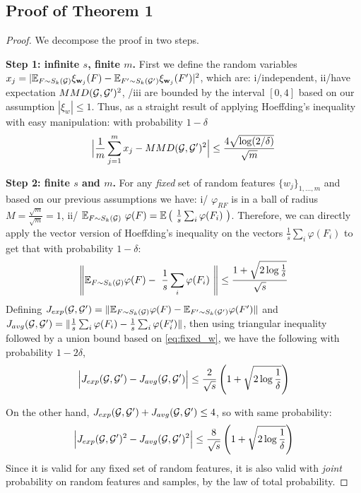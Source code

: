 \begin{appendices}
\section{Proof of Theorem 1}\label{app:proof}
\begin{proof} We decompose the proof in two steps.

\textbf{Step 1: infinite $s$, finite $m$.} First we define the random variables $x_j=| \mathbb{E}_{F \sim S_k(\mathcal{G})} \xi_{\mathbf{w}_j}(F) - \mathbb{E}_{F' \sim S_k(\mathcal{G}')} \xi_{\mathbf{w}_j}(F') |^2$, which are: i/independent, ii/have expectation $MMD(\mathcal{G},\mathcal{G}')^2$, /iii are bounded by the interval $[0,4]$ based on our assumption $|\xi_w|\leq 1$. Thus, as a straight result of applying  Hoeffding's inequality with easy manipulation: with probability $1-\delta$
\begin{equation}
\label{eq:step1}
\Big|\frac{1}{m} \sum_{j=1}^m x_j- MMD(\mathcal{G},\mathcal{G}')^2 \Big| \leq\\ \frac{4 \sqrt{\log (2/\delta)}}{\sqrt{m}}
\end{equation}

\textbf{Step 2: finite $s$ and $m$.} For any \emph{fixed} set of random features $\{w_j\}_{1,\ldots,m}$ and based on our previous assumptions we have: i/ $\varphi_{RF}$ is in a ball of radius $M=\frac{\sqrt{m}}{\sqrt{m}}=1$, ii/ $ \mathbb{E}_{F \sim S_k(\mathcal{G})}~ \varphi(F)= \mathbb{E}\left(~\frac{1}{{s}} \sum_i \varphi(F_i)~\right)$. Therefore, we can directly apply the vector version of Hoeffding's inequality on the vectors $\frac{1}{{s}} \sum_i \varphi(F_i)$ to get that with probability $1-\delta$:
\begin{equation}
    \label{eq:fixed_w}
    \left\|\mathbb{E}_{F \sim S_k(\mathcal{G})} \varphi(F)-~\frac{1}{s} \sum_i \varphi(F_i)~\right\|\leq \frac{1+\sqrt{2\log\frac{1}{\delta}}}{\sqrt{{s}}}
\end{equation}
\vfill\pagebreak
Defining $J_{exp}(\mathcal{G},\mathcal{G}')=\| \mathbb{E}_{F \sim S_k(\mathcal{G})} \varphi(F) - \mathbb{E}_{F' \sim S_k(\mathcal{G}')} \varphi(F')\|$ and $J_{avg}(\mathcal{G},\mathcal{G}')=\| \frac{1}{{s}} \sum_i \varphi(F_i) - \frac{1}{{s}} \sum_i \varphi(F'_i)\|$, then using triangular inequality followed by a union bound based on \eqref{eq:fixed_w}, we have the following with probability $1-2\delta$,
\begin{align*}
    \Big | J_{exp}(\mathcal{G},\mathcal{G}') - J_{avg}(\mathcal{G},\mathcal{G}')\Big | \leq \frac{2}{\sqrt{{s}}}\left(1+\sqrt{2\log\frac{1}{\delta}}\right)
\end{align*}

On the other hand, $ J_{exp}(\mathcal{G},\mathcal{G}') + J_{avg}(\mathcal{G},\mathcal{G}')\leq 4$, so with same probability:
\begin{equation}\label{eq:step2}
    \Big | J_{exp}(\mathcal{G},\mathcal{G}')^2 - J_{avg}(\mathcal{G},\mathcal{G}')^2 \Big | \leq \frac{8}{\sqrt{{s}}}\left(1+\sqrt{2\log\frac{1}{\delta}}\right)
\end{equation}
Since it is valid for any fixed set of random features, it is also valid with \emph{joint} probability on random features and samples, by the law of total probability.


\end{proof}
\end{appendices}
